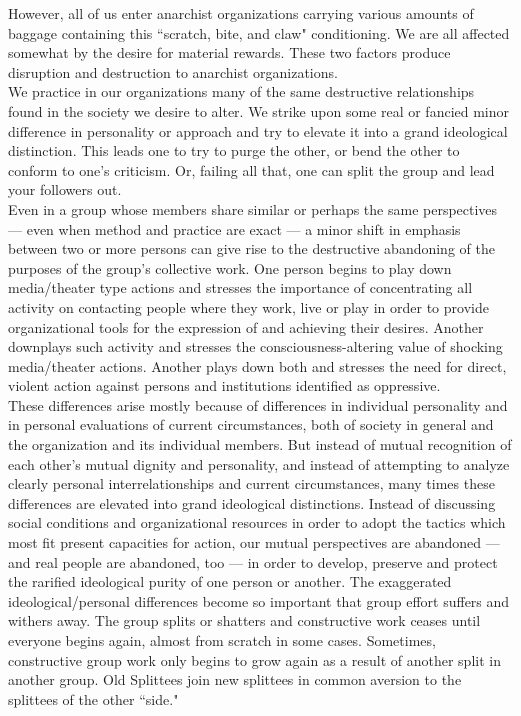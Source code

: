 However, all of us enter anarchist organizations carrying various amounts of baggage containing this ``scratch, bite, and claw" conditioning. We are all affected somewhat by the desire for material rewards. These two factors produce disruption and destruction to anarchist organizations.\\
We practice in our organizations many of the same destructive relationships found in the society we desire to alter. We strike upon some real or fancied minor difference in personality or approach and try to elevate it into a grand ideological distinction. This leads one to try to purge the other, or bend the other to conform to one's criticism. Or, failing all that, one can split the group and lead your followers out.\\
Even in a group whose members share similar or perhaps the same perspectives --- even when method and practice are exact --- a minor shift in emphasis between two or more persons can give rise to the destructive abandoning of the purposes of the group's collective work. One person begins to play down media/theater type actions and stresses the importance of concentrating all activity on contacting people where they work, live or play in order to provide organizational tools for the expression of and achieving their desires. Another downplays such activity and stresses the consciousness-altering value of shocking media/theater actions. Another plays down both and stresses the need for direct, violent action against persons and institutions identified as oppressive.\\
These differences arise mostly because of differences in individual personality and in personal evaluations of current circumstances, both of society in general and the organization and its individual members. But instead of mutual recognition of each other's mutual dignity and personality, and instead of attempting to analyze clearly personal interrelationships and current circumstances, many times these differences are elevated into grand ideological distinctions. Instead of discussing social conditions and organizational resources in order to adopt the tactics which most fit present capacities for action, our mutual perspectives are abandoned --- and real people are abandoned, too --- in order to develop, preserve and protect the rarified ideological purity of one person or another. The exaggerated ideological/personal differences become so important that group effort suffers and withers away. The group splits or shatters and constructive work ceases until everyone begins again, almost from scratch in some cases. Sometimes, constructive group work only begins to grow again as a result of another split in another group. Old Splittees  join new splittees in common aversion to the splittees of the other ``side."\\
